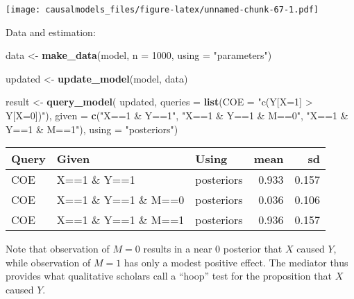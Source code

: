 \documentclass[
  12pt,
]{book}
\newenvironment{Shaded}{\begin{snugshade}}{\end{snugshade}}
\newcommand{\DataTypeTok}[1]{\textcolor[rgb]{0.13,0.29,0.53}{#1}}
\newcommand{\DecValTok}[1]{\textcolor[rgb]{0.00,0.00,0.81}{#1}}
\newcommand{\KeywordTok}[1]{\textcolor[rgb]{0.13,0.29,0.53}{\textbf{#1}}}
\newcommand{\NormalTok}[1]{#1}
\newcommand{\StringTok}[1]{\textcolor[rgb]{0.31,0.60,0.02}{#1}}
\begin{document}
\texttt{[image: causalmodels\_files/figure-latex/unnamed-chunk-67-1.pdf]}

Data and estimation:

\begin{Shaded}
\begin{Highlighting}[]
\NormalTok{data <-}\StringTok{ }\KeywordTok{make_data}\NormalTok{(model, }\DataTypeTok{n =} \DecValTok{1000}\NormalTok{, }\DataTypeTok{using =} \StringTok{"parameters"}\NormalTok{)}
\end{Highlighting}
\end{Shaded}

\begin{Shaded}
\begin{Highlighting}[]
\NormalTok{updated <-}\StringTok{ }\KeywordTok{update_model}\NormalTok{(model, data)}
\end{Highlighting}
\end{Shaded}

\begin{Shaded}
\begin{Highlighting}[]
\NormalTok{result <-}\StringTok{ }\KeywordTok{query_model}\NormalTok{(}
\NormalTok{    updated, }
    \DataTypeTok{queries =} \KeywordTok{list}\NormalTok{(}\DataTypeTok{COE =} \StringTok{"c(Y[X=1] > Y[X=0])"}\NormalTok{), }
    \DataTypeTok{given =} \KeywordTok{c}\NormalTok{(}\StringTok{"X==1 & Y==1"}\NormalTok{, }\StringTok{"X==1 & Y==1 & M==0"}\NormalTok{, }\StringTok{"X==1 & Y==1 & M==1"}\NormalTok{),}
    \DataTypeTok{using =} \StringTok{"posteriors"}\NormalTok{)}
\end{Highlighting}
\end{Shaded}

\begin{tabular}{l|l|l|r|r}
\hline
Query & Given & Using & mean & sd\\
\hline
COE & X==1 \& Y==1 & posteriors & 0.933 & 0.157\\
\hline
COE & X==1 \& Y==1 \& M==0 & posteriors & 0.036 & 0.106\\
\hline
COE & X==1 \& Y==1 \& M==1 & posteriors & 0.936 & 0.157\\
\hline
\end{tabular}

Note that observation of \(M=0\) results in a near 0 posterior that \(X\) caused \(Y\), while observation of \(M=1\) has only a modest positive effect. The mediator thus provides what qualitative scholars call a ``hoop'' test for the proposition that \(X\) caused \(Y\).
\end{document}
